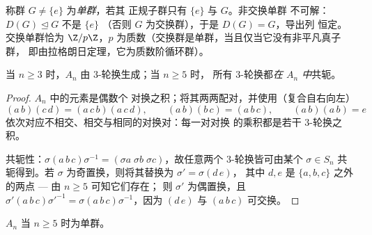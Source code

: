 \begin{definition}\label{def:b3:groups:simple}
称群 $G \neq \{e\}$ 为\emph{单群}，若其
正规子群只有 $\{e\}$ 与 $G$。非交换单群
不可解：$D(G) \trianglelefteq G$ 不是 $\{e\}$
（否则 $G$ 为交换群），于是 $D(G) = G$，导出列
恒定。交换单群恰为 $\Z/p\Z$，$p$
为质数（交换群是单群，当且仅当它没有非平凡真子群，
即由拉格朗日定理，它为质数阶循环群）。
\end{definition}

\begin{lemma}\label{lem:b3:groups:threecycles}
当 $n \geq 3$ 时，$A_n$ 由 $3$-轮换生成；当 $n \geq 5$ 时，
所有 $3$-轮换都\emph{在 $A_n$ 中}共轭。
\end{lemma}

\begin{proof}
$A_n$ 中的元素是偶数个
对换之积；将其两两配对，并使用（复合自右向左）
\[
(a\,b)(c\,d) = (a\,c\,b)(a\,c\,d), \qquad
(a\,b)(b\,c) = (a\,b\,c), \qquad
(a\,b)(a\,b) = e
\]
依次对应不相交、相交与相同的对换对：每一对对换
的乘积都是若干 $3$-轮换之积。

共轭性：$\sigma(a\,b\,c)\sigma^{-1} = (\sigma a\; \sigma b\;
\sigma c)$，故任意两个 $3$-轮换皆可由某个 $\sigma \in
S_n$ 共轭得到。若 $\sigma$ 为奇置换，则将其替换为 $\sigma' = \sigma (d\,e)$，
其中 $d, e$ 是 $\{a, b, c\}$ 之外的两点 --- 由 $n \geq 5$ 可知它们存在；
则 $\sigma'$ 为偶置换，且 $\sigma'(a\,b\,c)
\sigma'^{-1} = \sigma(a\,b\,c)\sigma^{-1}$，因为 $(d\,e)$ 与
$(a\,b\,c)$ 可交换。
\end{proof}

\begin{theorem}[交错群的单性]\label{thm:b3:groups:ansimple}
$A_n$ 当 $n \geq 5$ 时为单群。
\end{theorem}

